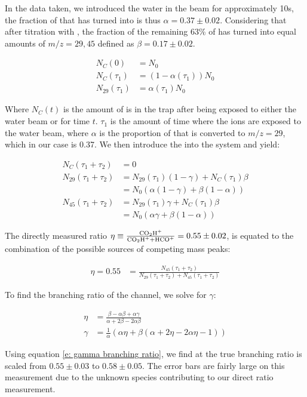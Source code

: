 In the data taken, we introduced the water in the beam for approximately 10s, the fraction of  that has turned into \ce{[HCO]+} is thus $\alpha = 0.37 \pm 0.02$. Considering that after titration with , the fraction of the remaining 63\% of  has turned into equal amounts of $m/z=29, 45$ defined as $\beta = 0.17 \pm 0.02$.

\begin{align*}
	N_C(0) & = N_0 \\
	N_C(\tau_1) & = (1-\alpha(\tau_1))N_0 \\
	N_{29}(\tau_1) & = \alpha(\tau_1) N_0
\end{align*}

Where $N_C(t)$ is the amount of  is in the trap after being exposed to either the water beam or  for time $t$. $\tau_1$ is the amount of time where the ions are exposed to the water beam, where $\alpha$ is the proportion of  that is converted to $m/z=29$, which in our case is 0.37. We then introduce the  into the system and yield:

\begin{align*}
	N_C(\tau_1 + \tau_2) & = 0 \\
	N_{29}(\tau_1 + \tau_2) & = N_{29}(\tau_1)(1-\gamma) + N_C(\tau_1)\beta \\
	& = N_0(\alpha(1-\gamma)+\beta(1-\alpha)) \\
	N_{45}(\tau_1 + \tau_2) & = N_{29}(\tau_1)\gamma + N_C(\tau_1)\beta \\
	& = N_0(\alpha \gamma+\beta(1-\alpha))
\end{align*}

The directly measured ratio $\eta \equiv \frac{\ce{CO2H+}}{\ce{CO2H+} + \ce{HCO+}} = 0.55 \pm 0.02$, is equated to the combination of the possible sources of competing mass peaks:

\begin{align}
	\eta = 0.55 & = \frac{N_{45}(\tau_1 + \tau_2)}{N_{29}(\tau_1 + \tau_2) + N_{45}(\tau_1 + \tau_2)}
\end{align}

To find the branching ratio of the  channel, we solve for $\gamma$:

\begin{align}
	\eta & = \frac{\beta - \alpha \beta + \alpha \gamma}{\alpha + 2\beta - 2\alpha\beta} \nonumber \\
	\gamma & = \frac{1}{\alpha} (\alpha \eta + \beta(\alpha + 2\eta - 2\alpha \eta - 1)) \label{e: gamma branching ratio}
\end{align}

Using equation \ref{e: gamma branching ratio}, we find at the true branching ratio is scaled from $0.55 \pm 0.03$ to $0.58 \pm 0.05$. The error bars are fairly large on this measurement due to the unknown species contributing to our direct ratio measurement.
